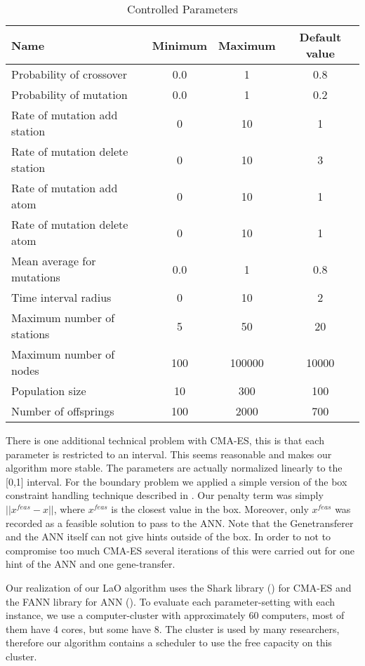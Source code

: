 \documentclass{acm_proc_article-sp}
\begin{document}
\begin{table*}[ht]
\centering
\begin{tabular}{l c c c}
\hline\hline
Name & Minimum & Maximum & Default value \\ 
\hline
Probability of crossover & 0.0 & 1 & 0.8 \\
Probability of mutation & 0.0& 1& 0.2 \\
Rate of mutation add station& 0& 10& 1 \\
Rate of mutation delete station& 0& 10& 3 \\
Rate of mutation add atom& 0& 10& 1 \\
Rate of mutation delete atom& 0& 10& 1 \\
Mean average for mutations& 0.0& 1& 0.8 \\
Time interval radius& 0& 10& 2 \\
Maximum number of stations& 5& 50& 20 \\
Maximum number of nodes& 100& 100000& 10000 \\
Population size& 10& 300& 100 \\
Number of offsprings& 100& 2000& 700 \\
\hline
\end{tabular}
\caption{Controlled Parameters}
\label{table:parameters}
\end{table*} 


There is one additional technical problem with CMA-ES, this is that each parameter is restricted to an interval. This seems reasonable and makes our algorithm more stable. The parameters are actually normalized linearly to the [0,1] interval. For the boundary problem we applied a simple version of the box constraint handling technique described in \cite{hansen2009tec}. Our penalty term was simply \begin{math}||x^{feas}-x|| \end{math}, where \begin{math}x^{feas}\end{math} is the closest value in the box. Moreover, only \begin{math}x^{feas}\end{math} was recorded as a feasible solution to pass to the ANN. Note that the Genetransferer and the ANN itself can not give hints outside of the box. In order to not to compromise too much CMA-ES several iterations of this were carried out for one hint of the ANN and one gene-transfer.

Our realization of our LaO algorithm uses the Shark library (\cite{shark08}) for CMA-ES and the FANN library for ANN (\cite{nissen}). To evaluate each parameter-setting with each instance, we use a computer-cluster with approximately 60 computers, most of them have 4 cores, but some have 8. The cluster is used by many researchers, therefore our algorithm contains a scheduler to use the free capacity on this cluster.
\end{document}
